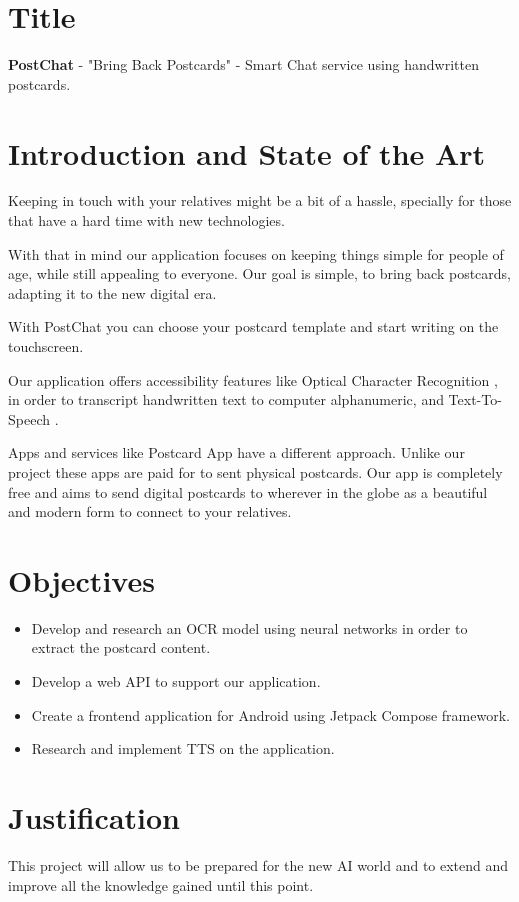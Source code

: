 \documentclass[11pt,a4paper]{article}
\begin{document}
\vspace{5mm}

\section{Title}

\textbf{PostChat} - "Bring Back Postcards" - Smart Chat service using handwritten postcards.
	

\section {Introduction and State of the Art}
	Keeping in touch with your relatives might be a bit of a hassle, specially for those that have a hard time with new technologies. \par
	With that in mind our application focuses on keeping things simple for people of age, while still appealing to everyone.
	Our goal is simple, to bring back postcards, adapting it to the new digital era.\par
	With PostChat you can choose your postcard template and start writing on the touchscreen.\par
	Our application offers accessibility features like Optical Character Recognition \cite{IBM2023}, in order to transcript handwritten text to computer alphanumeric, and Text-To-Speech \cite{Oracle2023}.\par
	Apps and services like Postcard App \cite{Ltd2023} have a different approach. Unlike our project these apps are paid for to sent physical postcards.
	Our app is completely free and aims to send digital postcards to wherever in the globe as a beautiful and modern form to connect to your relatives.

\section{Objectives}
	\begin{itemize}
		\item Develop and research an OCR model using neural networks in order to extract the postcard content.
		\item Develop a web API to support our application.
		\item Create a frontend application for Android using Jetpack Compose framework.
		\item Research and implement TTS on the application.
	\end{itemize}

\section{Justification}
	This project will allow us to be prepared for the new AI world and to extend and improve all the knowledge gained until this point. \par
	
\end{document}
